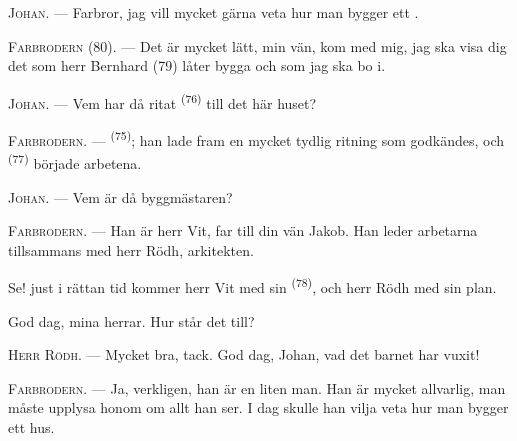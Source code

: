 %
%

\VUsaut{6.0mm}
\VUsaut{1.4mm}
\VUsaut{2.2mm}

\VUsaut{3.0mm}

\textsc{Johan}. --- Farbror, jag vill mycket gärna veta hur man bygger ett
.

\textsc{Farbrodern} (80). --- Det är mycket lätt, min vän, kom med mig, jag ska visa dig det
som herr Bernhard (79) låter bygga och som jag ska bo i.

\textsc{Johan}. --- Vem har då ritat  \textsuperscript{(76)} till det här
huset?

\textsc{Farbrodern}. ---  \textsuperscript{(75)}; han lade fram en mycket
tydlig ritning som godkändes, och  \textsuperscript{(77)} började
arbetena.

\textsc{Johan}. --- Vem är då byggmästaren?

\textsc{Farbrodern}. --- Han är herr Vit, far till din vän Jakob. Han leder arbetarna
tillsammans med herr Rödh, arkitekten.

Se! just i rättan tid kommer herr Vit med sin  \textsuperscript{(78)}, och
herr Rödh med sin plan.

God dag, mina herrar. Hur står det till?

\textsc{Herr Rödh}. --- Mycket bra, tack. God dag, Johan, vad det barnet har vuxit!

\textsc{Farbrodern}. --- Ja, verkligen, han är en liten man. Han är mycket allvarlig, man
måste upplysa honom om allt han ser. I dag skulle han vilja veta hur man bygger ett hus.

